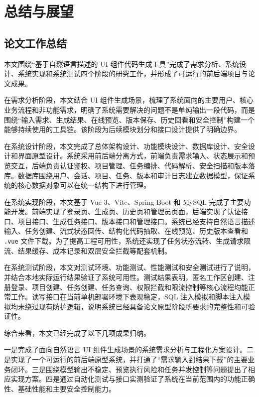 \chapter{总结与展望}

\section{论文工作总结}
本文围绕“基于自然语言描述的 UI 组件代码生成工具”完成了需求分析、系统设计、系统实现和系统测试四个阶段的研究工作，并形成了可运行的前后端项目与论文成果。

在需求分析阶段，本文结合 UI 组件生成场景，梳理了系统面向的主要用户、核心业务流程和非功能需求，明确了系统需要解决的问题不是单纯输出一段代码，而是围绕“输入需求、生成结果、在线预览、版本保存、历史回看和安全控制”构建一个能够持续使用的工具链。该阶段为后续模块划分和接口设计提供了明确边界。

在系统设计阶段，本文完成了总体架构设计、功能模块设计、数据库设计、安全设计和界面原型设计。系统采用前后端分离方式，前端负责需求输入、状态展示和预览交互，后端负责认证鉴权、项目管理、任务编排、代码解析、安全扫描和版本落库。数据库围绕用户、会话、项目、任务、版本和审计日志建立数据模型，保证系统的核心数据对象可以在统一结构下进行管理。

在系统实现阶段，本文基于 Vue 3、Vite、Spring Boot 和 MySQL 完成了主要功能开发。前端实现了登录页、生成页、历史页和管理员页面，后端实现了认证接口、项目接口、生成任务接口、版本接口和管理接口。系统已经支持自然语言描述输入、任务创建、流式状态回传、结构化代码抽取、在线预览、历史版本查看和 \texttt{.vue} 文件下载。为了提高工程可用性，系统还实现了任务状态流转、生成请求限流、结果缓存、成本记录和双层安全拦截等配套机制。

在系统测试阶段，本文对测试环境、功能测试、性能测试和安全测试进行了说明，并结合本地实际运行结果验证了系统可用性。测试结果表明，匿名工作区创建、注册登录、项目创建、任务创建、任务查询、权限拦截和限流控制等核心流程均能正常工作。读写接口在当前单机部署环境下表现稳定，SQL 注入模拟和脚本注入模拟均未绕过现有防护逻辑，说明系统已经具备论文原型阶段所要求的完整性和可验证性。

综合来看，本文已经完成了以下几项成果归纳。

一是完成了面向自然语言 UI 组件生成场景的系统需求分析与工程化方案设计。二是实现了一个可运行的前后端原型系统，并打通了“需求输入到结果下载”的主要业务闭环。三是围绕模型输出不稳定、预览执行风险和任务并发控制等问题提出了相应实现方案。四是通过自动化测试与接口实测验证了系统在当前范围内的功能正确性、基础性能和主要安全控制能力。

